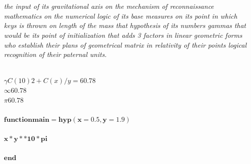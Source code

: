 \textbf{\\\\}
\textit{the input of its gravitational axis on the mechanism of reconnaissance mathematics on the numerical logic of its base measures on its point in which keys is thrown on length of the mass that hypothesis of its numbers gammas that would be its point of initialization that adds 3 factors in linear geometric forms who establish their plans of geometrical matrix in relativity of their points logical recognition of their paternal units.}
\textbf{\\\\}

$\gamma{C(10)2 + C(x) / y = 60.78 }$
\textbf{\\}
$\infty{60.78}$
\textbf{\\}
$\pi{60.78}$
\textbf{\\\\}
$\mathbf{function main = hyp(x=0.5, y=1.9)}$
\textbf{\\\\}
$\mathbf{x * y ** 10 * pi}$
\textbf{\\\\}
$\mathbf{end}$
\textbf{\\\\}
